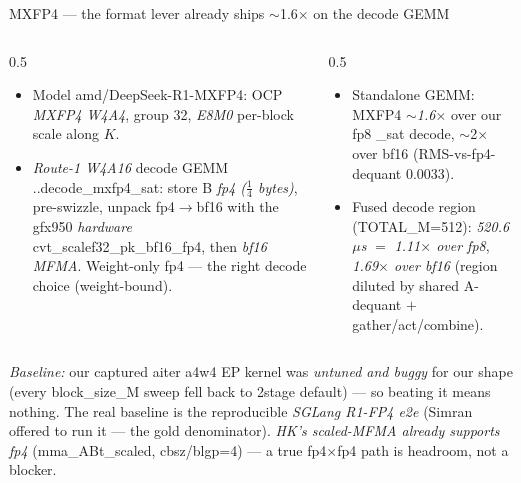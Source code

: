 \documentclass[pdf,aspectratio=169]{beamer}
\newcommand{\empy}[1]{{\color{darkorange}\emph{#1}}}
\newcommand{\empr}[1]{{\color{cardinalred}\emph{#1}}}
\newcommand{\examplebox}[2]{%
\begin{tcolorbox}[colframe=darkcardinal,colback=boxgray,title={#1}]
#2
\end{tcolorbox}}
\newcommand{\mc}[1]{{\ttfamily\small #1}}
\begin{document}
\begin{frame}{MXFP4 --- the format lever already ships $\sim$1.6$\times$ on the decode GEMM}
\footnotesize
\begin{columns}
\begin{column}{0.5\textwidth}
\examplebox{Setup (real MX checkpoint)}{\scriptsize
\begin{itemize}\scriptsize
  \item Model \mc{amd/DeepSeek-R1-MXFP4}: OCP \empy{MXFP4 W4A4}, group 32, \empr{E8M0} per-block scale along $K$.
  \item \empy{Route-1 W4A16} decode GEMM \mc{..decode\_mxfp4\_sat}: store B \empr{fp4 ($\frac14$ bytes)}, pre-swizzle, unpack fp4$\to$bf16 with the gfx950 \emph{hardware} \mc{cvt\_scalef32\_pk\_bf16\_fp4}, then \empy{bf16 MFMA}. Weight-only fp4 --- the right decode choice (weight-bound).
\end{itemize}}
\end{column}
\begin{column}{0.5\textwidth}
\examplebox{Measured (8$\times$MI350, same node)}{\footnotesize
\begin{itemize}\scriptsize
  \item Standalone GEMM: MXFP4 \empr{$\sim$1.6$\times$} over our fp8 \mc{\_sat} decode, $\sim$2$\times$ over bf16 (RMS-vs-fp4-dequant 0.0033).
  \item Fused decode region (\mc{TOTAL\_M=512}): \empr{520.6\,$\mu$s} $=$ \empy{1.11$\times$ over fp8}, \empy{1.69$\times$ over bf16} (region diluted by shared A-dequant $+$ gather/act/combine).
\end{itemize}}
\end{column}
\end{columns}
\vspace{-0.5ex}
\examplebox{Honest caveat + the hardware is ready}{\scriptsize
\empr{Baseline:} our captured aiter \mc{a4w4} EP kernel was \emph{untuned and buggy} for our shape (every \mc{block\_size\_M} sweep fell back to \mc{2stage default}) --- so beating it means nothing. The real baseline is the reproducible \empy{SGLang R1-FP4 e2e} (Simran offered to run it --- the gold denominator). \empy{HK's scaled-MFMA already supports fp4} (\mc{mma\_ABt\_scaled}, \mc{cbsz/blgp=4}) --- a true fp4$\times$fp4 path is headroom, not a blocker.}
\end{frame}
\end{document}
